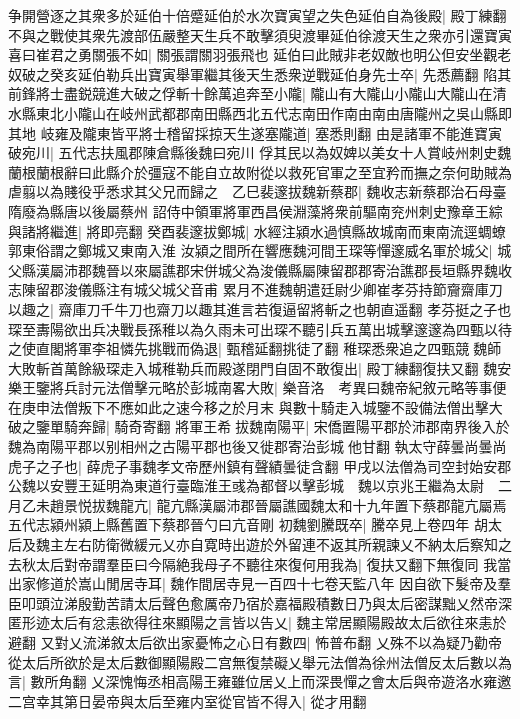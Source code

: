 争開營逐之其衆多於延伯十倍蹙延伯於水次寶寅望之失色延伯自為後殿|{
	殿丁練翻}
不與之戰使其衆先渡部伍嚴整天生兵不敢擊須臾渡畢延伯徐渡天生之衆亦引還寶寅喜曰崔君之勇關張不如|{
	關張謂關羽張飛也}
延伯曰此賊非老奴敵也明公但安坐觀老奴破之癸亥延伯勒兵出寶寅舉軍繼其後天生悉衆逆戰延伯身先士卒|{
	先悉薦翻}
陷其前鋒將士盡鋭競進大破之俘斬十餘萬追奔至小隴|{
	隴山有大隴山小隴山大隴山在清水縣東北小隴山在岐州武都郡南田縣西北五代志南田作南由南由唐隴州之吳山縣即其地}
岐雍及隴東皆平將士稽留採掠天生遂塞隴道|{
	塞悉則翻}
由是諸軍不能進寶寅破宛川|{
	五代志扶風郡陳倉縣後魏曰宛川}
俘其民以為奴婢以美女十人賞岐州刺史魏蘭根蘭根辭曰此縣介於彊寇不能自立故附從以救死官軍之至宜矜而撫之奈何助賊為虐翦以為賤役乎悉求其父兄而歸之　乙巳裴邃拔魏新蔡郡|{
	魏收志新蔡郡治石母臺隋廢為縣唐以後屬蔡州}
詔侍中領軍將軍西昌侯淵藻將衆前驅南兖州刺史豫章王綜與諸將繼進|{
	將即亮翻}
癸酉裴邃拔鄭城|{
	水經注潁水過慎縣故城南而東南流逕蜩蟟郭東俗謂之鄭城又東南入淮}
汝潁之間所在響應魏河間王琛等憚邃威名軍於城父|{
	城父縣漢屬沛郡魏晉以來屬譙郡宋併城父為浚儀縣屬陳留郡郡寄治譙郡長垣縣界魏收志陳留郡浚儀縣注有城父城父音甫}
累月不進魏朝遣廷尉少卿崔孝芬持節齎齋庫刀以趣之|{
	齋庫刀千牛刀也齋刀以趣其進言若復逼留將斬之也朝直遥翻}
孝芬挺之子也琛至夀陽欲出兵决戰長孫稚以為久雨未可出琛不聽引兵五萬出城擊邃邃為四甄以待之使直閣將軍李祖憐先挑戰而偽退|{
	甄稽延翻挑徒了翻}
稚琛悉衆追之四甄競魏師大敗斬首萬餘級琛走入城稚勒兵而殿遂閉門自固不敢復出|{
	殿丁練翻復扶又翻}
魏安樂王鑒將兵討元法僧擊元略於彭城南畧大敗|{
	樂音洛　考異曰魏帝紀敘元略等事便在庚申法僧叛下不應如此之速今移之於月末}
與數十騎走入城鑒不設備法僧出擊大破之鑒單騎奔歸|{
	騎奇寄翻}
將軍王希拔魏南陽平|{
	宋僑置陽平郡於沛郡南界後入於魏為南陽平郡以别相州之古陽平郡也後又徙郡寄治彭城他甘翻}
執太守薛曇尚曇尚虎子之子也|{
	薛虎子事魏孝文帝歷州鎮有聲績曇徒含翻}
甲戌以法僧為司空封始安郡公魏以安豐王延明為東道行臺臨淮王彧為都督以擊彭城　魏以京兆王繼為太尉　二月乙未趙景悦拔魏龍亢|{
	龍亢縣漢屬沛郡晉屬譙國魏太和十九年置下蔡郡龍亢屬焉五代志潁州潁上縣舊置下蔡郡晉勺曰亢音剛}
初魏劉騰既卒|{
	騰卒見上卷四年}
胡太后及魏主左右防衛微緩元乂亦自寛時出遊於外留連不返其所親諫乂不納太后察知之去秋太后對帝謂羣臣曰今隔絶我母子不聽往來復何用我為|{
	復扶又翻下無復同}
我當出家修道於嵩山閒居寺耳|{
	魏作間居寺見一百四十七卷天監八年}
因自欲下髮帝及羣臣叩頭泣涕殷勤苦請太后聲色愈厲帝乃宿於嘉福殿積數日乃與太后密謀黜乂然帝深匿形迹太后有忿恚欲得往來顯陽之言皆以告乂|{
	魏主常居顯陽殿故太后欲往來恚於避翻}
又對乂流涕敘太后欲出家憂怖之心日有數四|{
	怖普布翻}
乂殊不以為疑乃勸帝從太后所欲於是太后數御顯陽殿二宫無復禁礙乂舉元法僧為徐州法僧反太后數以為言|{
	數所角翻}
乂深愧悔丞相高陽王雍雖位居乂上而深畏憚之會太后與帝遊洛水雍邀二宫幸其第日晏帝與太后至雍内室從官皆不得入|{
	從才用翻}

